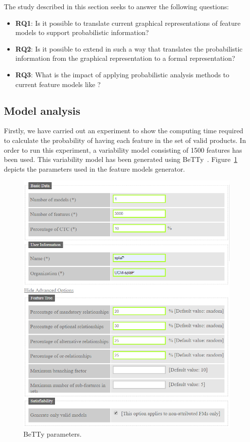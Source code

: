 The study described in this section seeks to answer the following questions:

\begin{itemize}
        \item \textbf{RQ1}: Is it possible to translate current graphical representations of feature models to
        support probabilistic information?
        \item \textbf{RQ2}: Is it possible to extend \fodaPA in such a way that
        translates the probabilistic information from the graphical representation to a formal representation?
        \item \textbf{RQ3}: What is the impact of applying probabilistic analysis methods to current feature models like \FODA?
\end{itemize}




\subsection{Model analysis}
\label{sec:stat:impl:model:analysis}

Firstly, we have carried out an experiment to
show the computing time required to calculate the probability of having
each feature in the set of valid products.
In order to run this experiment, a variability model consisting of
1500 features has been used.
This variability model
has been generated using BeTTy~\cite{SeguraHBC11}.
Figure~\ref{fig:plot:betty:params} depicts the parameters used in the feature models
generator.

\begin{figure}[h]
        \centering
        \linefigure
        \includegraphics[width=0.8\hsize,angle=0]{BeTTy_website2.png}
        \linefigure
        \caption{BeTTy parameters.}\label{fig:plot:betty:params}
\end{figure}


